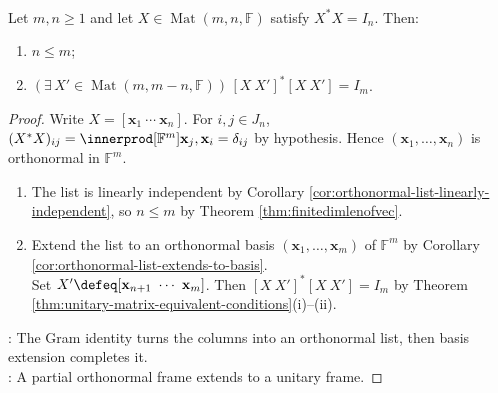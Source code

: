 \begin{theorem} \label{thm:extend-isometric-columns-to-unitary-matrix} \\
Let $m,n\geq1$ and let $X\in\operatorname{Mat}(m,n,\mathbb{F})$ satisfy $X^*X=I_n$. Then:
\begin{enumerate}[label=(\roman*)]
\setlength{\itemsep}{0pt}
\item $n\leq m$;
\item $(\exists\,X'\in\operatorname{Mat}(m,m-n,\mathbb{F}))\,[X\ X']^*[X\ X']=I_m$.
\end{enumerate}
\begin{proof}
Write $X=[\mathbf{x}_1\ \cdots\ \mathbf{x}_n]$. For $i,j\in J_n$, $(X^*X)_{ij}=\innerprod[\mathbb{F}^m]{\mathbf{x}_j,\mathbf{x}_i}=\delta_{ij}$ by hypothesis. Hence $(\mathbf{x}_1,\ldots,\mathbf{x}_n)$ is orthonormal in $\mathbb{F}^m$.
\begin{enumerate}[label=(\roman*)]
\setlength{\itemsep}{0pt}
\item The list is linearly independent by Corollary \ref{cor:orthonormal-list-linearly-independent}, so $n\leq m$ by Theorem \ref{thm:finitedimlenofvec}.
\item Extend the list to an orthonormal basis $(\mathbf{x}_1,\ldots,\mathbf{x}_m)$ of $\mathbb{F}^m$ by Corollary \ref{cor:orthonormal-list-extends-to-basis}.\\
Set $X'\defeq[\mathbf{x}_{n+1}\ \cdots\ \mathbf{x}_m]$. Then $[X\ X']^*[X\ X']=I_m$ by Theorem \ref{thm:unitary-matrix-equivalent-conditions}(i)--(ii).
\end{enumerate}
: The Gram identity turns the columns into an orthonormal list, then basis extension completes it.\\
: A partial orthonormal frame extends to a unitary frame.
\end{proof}
\end{theorem}
